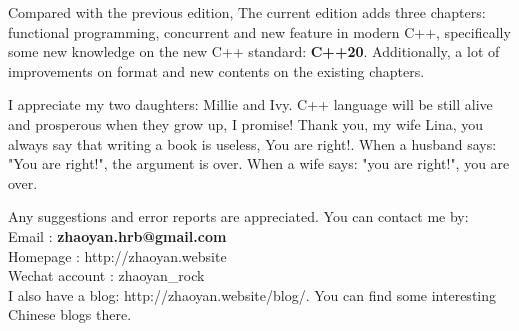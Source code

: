 \documentclass[a4paper,11pt,twoside]{book}
\begin{document}
\medskip

Compared with the previous edition, The current edition adds three chapters: functional programming, concurrent and new feature in modern C++,  specifically some new knowledge on the new C++ standard: \textbf{C++20}. Additionally, a lot of improvements on format and new contents on the existing chapters. \medskip  


I appreciate my two daughters: Millie and Ivy. C++ language will be still alive and prosperous when they grow up, I promise! Thank you, my wife Lina, you always say that writing a book is useless, You are right!. When a husband says: "You are right!", the argument is over. When a wife says: "you are right!", you are over. \par \par \medskip


Any suggestions and error reports are appreciated. You can contact me by: \\
Email          : \textbf{zhaoyan.hrb@gmail.com}  \\ 
Homepage       : http://zhaoyan.website  \\ 
Wechat account : zhaoyan\_rock   \\ 

I also have a blog: http://zhaoyan.website/blog/. You can find some interesting Chinese blogs there. 
\end{document}
